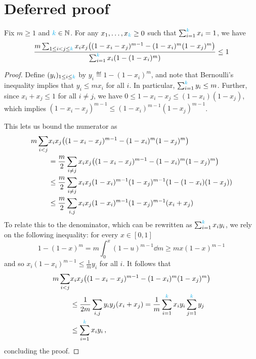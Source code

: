 \section{Deferred proof}
  \label{sec:deferred:chap:identity}
\begin{lemma}
Fix $m \geq 1$ and ${\textcolor{cyan}{k}} \in \mathbb{N}$. For any $x_1,\dots,x_{\textcolor{cyan}{k}} \geq 0$ such that $\sum_{i=1}^{\textcolor{cyan}{k}} x_i = 1$, we have
\[
    \frac{m\sum_{1\leq i < j \leq \ab} x_i x_j \Paren{ (1-x_i - x_j)^{m-1} - (1-x_i)^m(1-x_j)^m} }{\sum_{i=1}^\ab x_i (1-(1-x_i)^m)} \leq 1
\]
\end{lemma}
\begin{proof}
Define $(y_i)_{1\leq i\leq {\textcolor{cyan}{k}}}$ by $y_i \eqdef 1-(1-x_i)^m$, and note that Bernoulli's inequality implies that $y_i \leq m x_i$ for all $i$. In particular, $\sum_{i=1}^{\textcolor{cyan}{k}} y_i \leq m$. Further, since $x_i + x_j \leq 1$ for all $i\neq j$, we have $0 \leq 1-x_i -x_j \leq (1-x_i)(1-x_j)$, which implies $(1-x_i -x_j)^{m-1} \leq (1-x_i)^{m-1}(1-x_j)^{m-1}$.

This lets us bound the numerator as
\begin{align*}
m\sum_{i < j} &x_i x_j \Paren{ (1-x_i - x_j)^{m-1} - (1-x_i)^m(1-x_j)^m} \\
&= \frac{m}{2}\sum_{i \neq j} x_i x_j \Paren{ (1-x_i - x_j)^{m-1} - (1-x_i)^m(1-x_j)^m} \\
&\leq \frac{m}{2}\sum_{i \neq j} x_i x_j (1-x_i)^{m-1}(1-x_j)^{m-1} \Paren{ 1 - (1-x_i)(1-x_j)} \\
&\leq \frac{m}{2}\sum_{i, j} x_i x_j (1-x_i)^{m-1}(1-x_j)^{m-1} \Paren{x_i+x_j}
\end{align*}
To relate this to the denominator, which can be rewritten as $\sum_{i=1}^{\textcolor{cyan}{k}} x_i y_i$, we rely on the following inequality: for every $x\in[0,1]$
\[
1-(1-x)^m = m\int_{0}^x (1-u)^{m-1} \dd{m} \geq m x (1-x)^{m-1}
\]
and so $x_i (1-x_i)^{m-1} \leq \frac{1}{m}y_i$ for all $i$. It follows that
\begin{align*}
m\sum_{i < j} &x_i x_j \Paren{ (1-x_i - x_j)^{m-1} - (1-x_i)^m(1-x_j)^m} \\
&\leq \frac{1}{2m}\sum_{i, j} y_i y_j \Paren{x_i+x_j} 
= \frac{1}{m}\sum_{i=1}^\ab x_i y_i \sum_{j=1}^\ab y_j \\
&\leq \sum_{i=1}^\ab x_i y_i\,,
\end{align*}
concluding the proof.
\end{proof}

\bgroup\color{black!50!purple}
